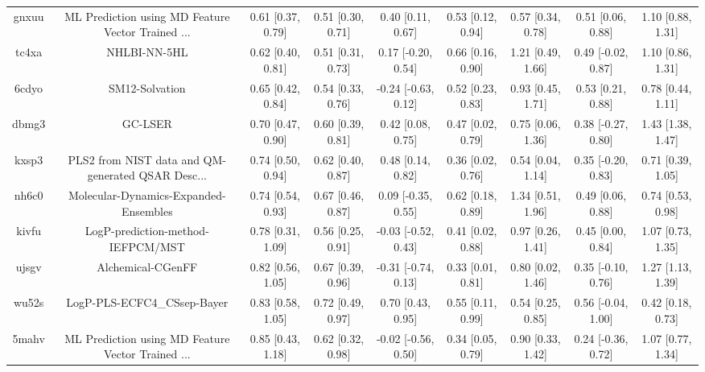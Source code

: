 \documentclass{article}
\begin{document}
\begin{center}
\begin{longtable}{|ccccccccc|}
 gnxuu &  ML Prediction using MD Feature Vector Trained ... &  0.61 [0.37, 0.79] &  0.51 [0.30, 0.71] &     0.40 [0.11, 0.67] &  0.53 [0.12, 0.94] &    0.57 [0.34, 0.78] &    0.51 [0.06, 0.88] &     1.10 [0.88, 1.31] \\
 tc4xa &                                       NHLBI-NN-5HL &  0.62 [0.40, 0.81] &  0.51 [0.31, 0.73] &    0.17 [-0.20, 0.54] &  0.66 [0.16, 0.90] &    1.21 [0.49, 1.66] &   0.49 [-0.02, 0.87] &     1.10 [0.86, 1.31] \\
 6cdyo &                                     SM12-Solvation &  0.65 [0.42, 0.84] &  0.54 [0.33, 0.76] &   -0.24 [-0.63, 0.12] &  0.52 [0.23, 0.83] &    0.93 [0.45, 1.71] &    0.53 [0.21, 0.88] &     0.78 [0.44, 1.11] \\
 dbmg3 &                                            GC-LSER &  0.70 [0.47, 0.90] &  0.60 [0.39, 0.81] &     0.42 [0.08, 0.75] &  0.47 [0.02, 0.79] &    0.75 [0.06, 1.36] &   0.38 [-0.27, 0.80] &     1.43 [1.38, 1.47] \\
 kxsp3 &  PLS2 from NIST data and QM-generated QSAR Desc... &  0.74 [0.50, 0.94] &  0.62 [0.40, 0.87] &     0.48 [0.14, 0.82] &  0.36 [0.02, 0.76] &    0.54 [0.04, 1.14] &   0.35 [-0.20, 0.83] &     0.71 [0.39, 1.05] \\
 nh6c0 &              Molecular-Dynamics-Expanded-Ensembles &  0.74 [0.54, 0.93] &  0.67 [0.46, 0.87] &    0.09 [-0.35, 0.55] &  0.62 [0.18, 0.89] &    1.34 [0.51, 1.96] &    0.49 [0.06, 0.88] &     0.74 [0.53, 0.98] \\
 kivfu &                  LogP-prediction-method-IEFPCM/MST &  0.78 [0.31, 1.09] &  0.56 [0.25, 0.91] &   -0.03 [-0.52, 0.43] &  0.41 [0.02, 0.88] &    0.97 [0.26, 1.41] &    0.45 [0.00, 0.84] &     1.07 [0.73, 1.35] \\
 ujsgv &                                  Alchemical-CGenFF &  0.82 [0.56, 1.05] &  0.67 [0.39, 0.96] &   -0.31 [-0.74, 0.13] &  0.33 [0.01, 0.81] &    0.80 [0.02, 1.46] &   0.35 [-0.10, 0.76] &     1.27 [1.13, 1.39] \\
 wu52s &                        LogP-PLS-ECFC4\_CSsep-Bayer &  0.83 [0.58, 1.05] &  0.72 [0.49, 0.97] &     0.70 [0.43, 0.95] &  0.55 [0.11, 0.99] &    0.54 [0.25, 0.85] &   0.56 [-0.04, 1.00] &     0.42 [0.18, 0.73] \\
 5mahv &  ML Prediction using MD Feature Vector Trained ... &  0.85 [0.43, 1.18] &  0.62 [0.32, 0.98] &   -0.02 [-0.56, 0.50] &  0.34 [0.05, 0.79] &    0.90 [0.33, 1.42] &   0.24 [-0.36, 0.72] &     1.07 [0.77, 1.34] \\

\end{longtable}
\end{center}
\end{document}
